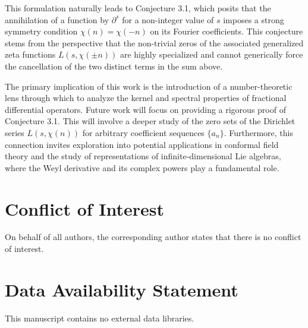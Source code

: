 \documentclass{artjlt}
\newcommand{\?}{\textbackslash}
\begin{document}
This formulation naturally leads to Conjecture 3.1, which posits that the annihilation of a function by $\partial^s$ for a non-integer value of $s$ imposes a strong symmetry condition $\chi(n) = \chi(-n)$ on its Fourier coefficients. This conjecture stems from the perspective that the non-trivial zeros of the associated generalized zeta functions $L(s, \chi(\pm n))$ are highly specialized and cannot generically force the cancellation of the two distinct terms in the sum above.

The primary implication of this work is the introduction of a number-theoretic lens through which to analyze the kernel and spectral properties of fractional differential operators. Future work will focus on providing a rigorous proof of Conjecture 3.1. This will involve a deeper study of the zero sets of the Dirichlet series $L(s, \chi(n))$ for arbitrary coefficient sequences $\{a_n\}$. Furthermore, this connection invites exploration into potential applications in conformal field theory and the study of representations of infinite-dimensional Lie algebras, where the Weyl derivative and its complex powers play a fundamental role.
\section*{Conflict of Interest}
On behalf of all authors, the corresponding author states that there is no conflict of interest.
\section*{Data Availability Statement}
This manuscript contains no external data libraries.
\end{document}
